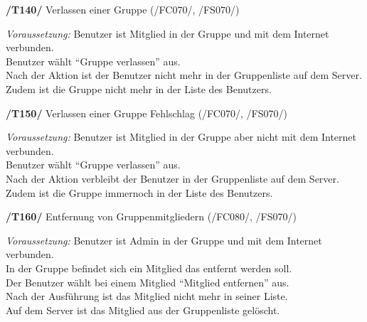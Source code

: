 \textbf{/T140/} Verlassen einer Gruppe (/FC070/, /FS070/)\\
\begin{center}
\vspace{-\parskip}
\begin{minipage}[t]{0.9\textwidth}
\emph{Voraussetzung:} Benutzer ist Mitglied in der Gruppe und mit dem Internet verbunden.\\
Benutzer wählt "`Gruppe verlassen"' aus.\\
Nach der Aktion ist der Benutzer nicht mehr in der Gruppenliste auf dem Server.\\
Zudem ist die Gruppe nicht mehr in der Liste des Benutzers.\\
\end{minipage}
\end{center}

\textbf{/T150/} Verlassen einer Gruppe Fehlschlag (/FC070/, /FS070/)\\
\begin{center}
\vspace{-\parskip}
\begin{minipage}[t]{0.9\textwidth}
\emph{Voraussetzung:} Benutzer ist Mitglied in der Gruppe aber nicht mit dem Internet verbunden.\\
Benutzer wählt "`Gruppe verlassen"' aus.\\
Nach der Aktion verbleibt der Benutzer in der Gruppenliste auf dem Server.\\
Zudem ist die Gruppe immernoch in der Liste des Benutzers.\\
\end{minipage}
\end{center}

\textbf{/T160/} Entfernung von Gruppenmitgliedern (/FC080/, /FS070/)\\
\begin{center}
\vspace{-\parskip}
\begin{minipage}[t]{0.9\textwidth}
\emph{Voraussetzung:} Benutzer ist Admin in der Gruppe und mit dem Internet verbunden.\\
In der Gruppe befindet sich ein Mitglied das entfernt werden soll.              \\
Der Benutzer wählt bei einem Mitglied "`Mitglied entfernen"' aus.                  \\
Nach der Ausführung ist das Mitglied nicht mehr in seiner Liste.                 \\
Auf dem Server ist das Mitglied aus der Gruppenliste gelöscht.                    \\
\end{minipage}
\end{center}

